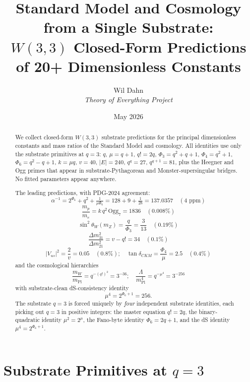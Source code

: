 \documentclass[11pt]{article}
\title{\textbf{Standard Model and Cosmology from a Single Substrate:\\
$W(3,3)$ Closed-Form Predictions of 20+ Dimensionless Constants}}
\author{Wil Dahn \\
\normalsize\textit{Theory of Everything Project}}
\date{May 2026}
\newcommand{\mPl}{m_{\mathrm{Pl}}}
\begin{document}
\maketitle

\begin{abstract}
We collect closed-form $W(3,3)$ substrate predictions for the principal
dimensionless constants and mass ratios of the Standard Model and
cosmology.  All identities use only the substrate primitives at $q = 3$:
$q$, $\mu = q+1$, $q! = 2q$, $\Phi_3 = q^2+q+1$, $\Phi_4 = q^2+1$,
$\Phi_6 = q^2-q+1$, $k = \mu q$, $v = 40$, $|E| = 240$, $q^q = 27$,
$q^{q+1} = 81$, plus the Heegner and Ogg primes that appear in
substrate-Pythagorean and Monster-supersingular bridges.  No fitted
parameters appear anywhere.

The leading predictions, with PDG-2024 agreement:
\[
  \alpha^{-1} = 2^{\Phi_6} + q^2 + \tfrac{1}{\mu\Phi_6}
              = 128 + 9 + \tfrac{1}{28} = 137.0357 \quad (\text{4 ppm})
\]
\[
  \frac{m_p}{m_e} = k\,q^2\,\mathrm{Ogg}_7 = 1836 \quad (0.008\%)
\]
\[
  \sin^2\theta_W(m_Z) = \frac{q}{\Phi_3} = \frac{3}{13} \quad (0.19\%)
\]
\[
  \frac{\Delta m^2_{31}}{\Delta m^2_{21}} = v - q! = 34 \quad (0.1\%)
\]
\[
  |V_{us}|^2 = \frac{2}{v} = 0.05 \quad (0.8\%);
  \quad
  \tan\delta_{CKM} = \frac{\Phi_4}{\mu} = 2.5 \quad (0.4\%)
\]
and the cosmological hierarchies
\[
  \frac{m_W}{\mPl} = q^{-(q!)^2} = 3^{-36}; \quad
  \frac{\Lambda}{\mPl^4} = q^{-\mu^4} = 3^{-256}
\]
with substrate-clean dS-consistency identity
\[
  \mu^4 = 2^{\Phi_6+1} = 256.
\]
The substrate $q = 3$ is forced uniquely by \emph{four} independent
substrate identities, each picking out $q = 3$ in positive integers:
the master equation $q! = 2q$, the binary-quadratic identity
$\mu^2 = 2^\mu$, the Fano-byte identity $\Phi_6 = 2q+1$, and the dS
identity $\mu^4 = 2^{\Phi_6+1}$.
\end{abstract}

\section{Substrate Primitives at $q = 3$}
\end{document}

